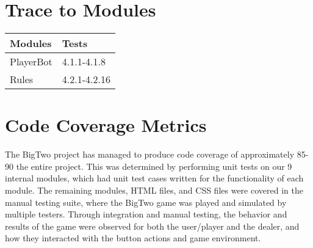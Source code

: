 \documentclass[12pt, titlepage]{article}
\begin{document}
\section{Trace to Modules}	
\begin{longtable}{@{}ll@{}}
\toprule
Modules & Tests \\* \midrule
\endfirsthead
%
\endhead
%
\bottomrule
\endfoot
%
\endlastfoot
%
PlayerBot & 4.1.1-4.1.8 \\* 
Rules & 4.2.1-4.2.16  \\*\bottomrule
\end{longtable}


\section{Code Coverage Metrics}
The BigTwo project has managed to produce code coverage of approximately 85-90%
the entire project. This was determined by performing unit tests on our 9 internal modules,
which had unit test cases written for the functionality of each module. The remaining
modules, HTML files, and CSS files were covered in the manual testing suite, where
the BigTwo game was played and simulated by multiple testers. Through integration and
manual testing, the behavior and results of the game were observed for both the user/player
and the dealer, and how they interacted with the button actions and game environment.




\end{document}
